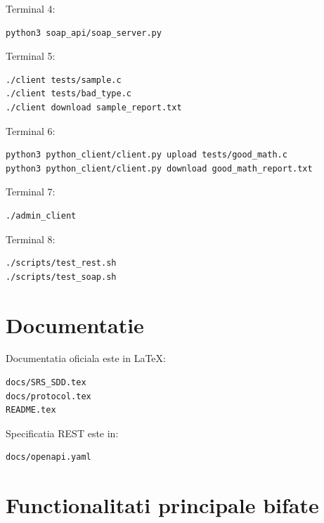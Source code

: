 \documentclass[12pt,a4paper]{article}
\begin{document}
Terminal 4:

\begin{lstlisting}[style=code]
python3 soap_api/soap_server.py
\end{lstlisting}

Terminal 5:

\begin{lstlisting}[style=code]
./client tests/sample.c
./client tests/bad_type.c
./client download sample_report.txt
\end{lstlisting}

Terminal 6:

\begin{lstlisting}[style=code]
python3 python_client/client.py upload tests/good_math.c
python3 python_client/client.py download good_math_report.txt
\end{lstlisting}

Terminal 7:

\begin{lstlisting}[style=code]
./admin_client
\end{lstlisting}

Terminal 8:

\begin{lstlisting}[style=code]
./scripts/test_rest.sh
./scripts/test_soap.sh
\end{lstlisting}

\section{Documentatie}

Documentatia oficiala este in LaTeX:

\begin{lstlisting}[style=code]
docs/SRS_SDD.tex
docs/protocol.tex
README.tex
\end{lstlisting}

Specificatia REST este in:

\begin{lstlisting}[style=code]
docs/openapi.yaml
\end{lstlisting}

\section{Functionalitati principale bifate}
\end{document}
